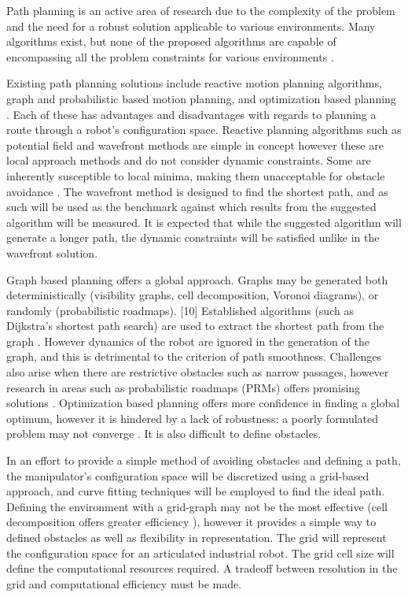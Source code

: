 %
Path planning is an active area of research due to the complexity of the problem and the need for a robust solution applicable to various environments. Many algorithms exist, but none of the proposed algorithms are capable of encompassing all the problem constraints for various environments \cite{sariff06}.

Existing path planning solutions include reactive motion planning algorithms, graph and probabilistic based motion planning, and optimization based planning \cite{waslanderI}. Each of these has advantages and disadvantages with regards to planning a route through a robot's configuration space. Reactive planning algorithms such as potential field and wavefront methods are simple in concept however these are local approach methods and do not consider dynamic constraints. Some are inherently susceptible to local minima, making them unacceptable for obstacle avoidance \cite{koren91}. The wavefront method is designed to find the shortest path, and as such will be used as the benchmark against which results from the suggested algorithm will be measured. It is expected that while the suggested algorithm will generate a longer path, the dynamic constraints will be satisfied unlike in the wavefront solution.

Graph based planning offers a global approach. Graphs may be generated both deterministically (visibility graphs, cell decomposition, Voronoi diagrams), or randomly (probabilistic roadmaps). [10] Established algorithms (such as Dijkstra's shortest path search) are used to extract the shortest path from the graph \cite{dijkstra59}. However dynamics of the robot are ignored in the generation of the graph, and this is detrimental to the criterion of path smoothness. Challenges also arise when there are restrictive obstacles such as narrow passages, however research in areas such as probabilistic roadmaps (PRMs) offers promising solutions \cite{hsu03}. Optimization based planning offers more confidence in finding a global optimum, however it is hindered by a lack of robustness: a poorly formulated problem may not converge \cite{waslanderIII}. It is also difficult to define obstacles.

In an effort to provide a simple method of avoiding obstacles and defining a path, the manipulator's configuration space will be discretized using a grid-based approach, and curve fitting techniques will be employed to find the ideal path. Defining the environment with a grid-graph may not be the most effective (cell decomposition offers greater efficiency \cite{lingelbach04}), however it provides a simple way to defined obstacles as well as flexibility in representation. The grid will represent the configuration space for an articulated industrial robot. The grid cell size will define the computational resources required. A tradeoff between resolution in the grid and computational efficiency must be made.


